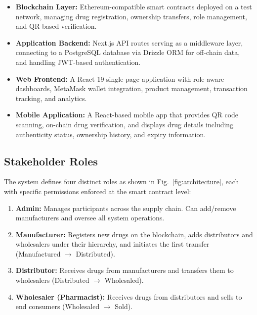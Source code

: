 \documentclass[conference]{IEEEtran}
\begin{document}
\begin{itemize}
\item \textbf{Blockchain Layer:} Ethereum-compatible smart contracts deployed on a test network, managing drug registration, ownership transfers, role management, and QR-based verification.
\item \textbf{Application Backend:} Next.js API routes serving as a middleware layer, connecting to a PostgreSQL database via Drizzle ORM for off-chain data, and handling JWT-based authentication.
\item \textbf{Web Frontend:} A React 19 single-page application with role-aware dashboards, MetaMask wallet integration, product management, transaction tracking, and analytics.
\item \textbf{Mobile Application:} A React-based mobile app that provides QR code scanning, on-chain drug verification, and displays drug details including authenticity status, ownership history, and expiry information.
\end{itemize}

\subsection{Stakeholder Roles}

The system defines four distinct roles as shown in Fig.~\ref{fig:architecture}, each with specific permissions enforced at the smart contract level:



\begin{enumerate}
\item \textbf{Admin:} Manages participants across the supply chain. Can add/remove manufacturers and oversee all system operations.
\item \textbf{Manufacturer:} Registers new drugs on the blockchain, adds distributors and wholesalers under their hierarchy, and initiates the first transfer (Manufactured $\rightarrow$ Distributed).
\item \textbf{Distributor:} Receives drugs from manufacturers and transfers them to wholesalers (Distributed $\rightarrow$ Wholesaled).
\item \textbf{Wholesaler (Pharmacist):} Receives drugs from distributors and sells to end consumers (Wholesaled $\rightarrow$ Sold).
\end{enumerate}
\end{document}
